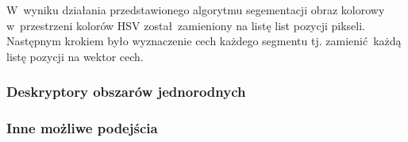 W~wyniku działania przedstawionego algorytmu segementacji obraz kolorowy w~przestrzeni kolorów HSV został zamieniony na listę list pozycji pikseli. Następnym krokiem było wyznaczenie cech każdego segmentu tj. zamienić każdą listę pozycji na wektor cech.

\subsubsection{Deskryptory obszarów jednorodnych}




\subsubsection{Inne możliwe podejścia}

